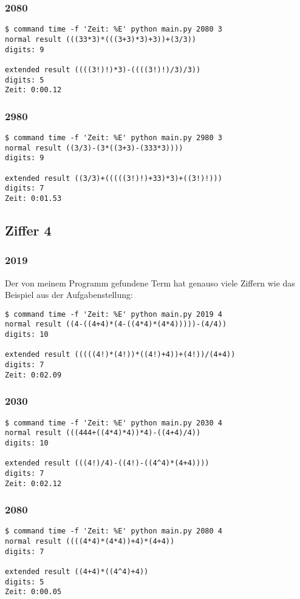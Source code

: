 \subsubsection{2080}
\begin{lstlisting}
$ command time -f 'Zeit: %E' python main.py 2080 3
normal result (((33*3)*(((3+3)*3)+3))+(3/3))
digits: 9

extended result ((((3!)!)*3)-((((3!)!)/3)/3))
digits: 5
Zeit: 0:00.12
\end{lstlisting}
\subsubsection{2980}
\begin{lstlisting}
$ command time -f 'Zeit: %E' python main.py 2980 3
normal result ((3/3)-(3*((3+3)-(333*3))))
digits: 9

extended result ((3/3)+(((((3!)!)+33)*3)+((3!)!)))
digits: 7
Zeit: 0:01.53
\end{lstlisting}
\subsection{Ziffer 4}
\subsubsection{2019}
Der von meinem Programm gefundene Term hat genauso viele Ziffern wie das Beispiel aus der Aufgabenstellung:
\begin{lstlisting}
$ command time -f 'Zeit: %E' python main.py 2019 4
normal result ((4-((4+4)*(4-((4*4)*(4*4)))))-(4/4))
digits: 10

extended result (((((4!)*(4!))*((4!)+4))+(4!))/(4+4))
digits: 7
Zeit: 0:02.09
\end{lstlisting}
\subsubsection{2030}
\begin{lstlisting}
$ command time -f 'Zeit: %E' python main.py 2030 4
normal result (((444+((4*4)*4))*4)-((4+4)/4))
digits: 10

extended result (((4!)/4)-((4!)-((4^4)*(4+4))))
digits: 7
Zeit: 0:02.12
\end{lstlisting}
\subsubsection{2080}
\begin{lstlisting}
$ command time -f 'Zeit: %E' python main.py 2080 4
normal result ((((4*4)*(4*4))+4)*(4+4))
digits: 7

extended result ((4+4)*((4^4)+4))
digits: 5
Zeit: 0:00.05
\end{lstlisting}
